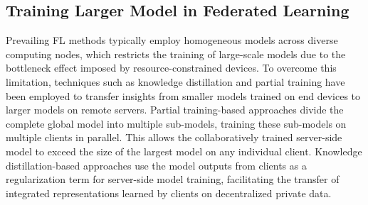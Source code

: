 \documentclass[10pt,journal]{IEEEtran}
\begin{document}
\subsection{Training Larger Model in Federated Learning}
Prevailing FL methods \cite{mcmahan2017communication,li2020federated,karimireddy2020scaffold} typically employ homogeneous models across diverse computing nodes, which restricts the training of large-scale models due to the bottleneck effect imposed by resource-constrained devices. To overcome this limitation, techniques such as knowledge distillation and partial training have been employed to transfer insights from smaller models trained on end devices to larger models on remote servers. Partial training-based approaches \cite{alam2022fedrolex,nguyen2023feddct} divide the complete global model into multiple sub-models, training these sub-models on multiple clients in parallel. This allows the collaboratively trained server-side model to exceed the size of the largest model on any individual client. Knowledge distillation-based approaches \cite{he2020group,cho2022heterogeneous,wu2024agglomerative} use the model outputs from clients as a regularization term for server-side model training, facilitating the transfer of integrated representations learned by clients on decentralized private data.
\end{document}
